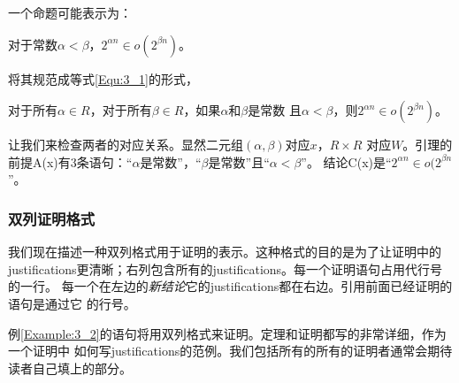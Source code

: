 \begin{example}\label{Example:3_2}
一个命题可能表示为：
\end{example}

\begin{proposition}
对于常数$\alpha<\beta$，$2^{\alpha n} \in o(2^{\beta n})$。
\end{proposition}
将其规范成等式\ref{Equ:3_1}的形式，
\begin{proposition}
对于所有$\alpha\in R$，对于所有$\beta\in R$，如果$\alpha$和$\beta$是常数
且$\alpha<\beta$，则$2^{\alpha n} \in o(2^{\beta n})$。
\end{proposition}

\noindent 让我们来检查两者的对应关系。显然二元组$(\alpha, \beta)$对应$x$，$R\times R$
对应$W$。引理的前提A(x)有3条语句：“$\alpha$是常数”，“$\beta$是常数”且“$\alpha<\beta$”。
结论C(x)是“$2^{\alpha n} \in o(2^{\beta n}$”。

\subsubsection{双列证明格式}
我们现在描述一种双列格式用于证明的表示。这种格式的目的是为了让证明中的
justifications更清晰；右列包含所有的justifications。每一个证明语句占用代行号的一行。
每一个在左边的\emph{新结论}它的justifications都在右边。引用前面已经证明的语句是通过它
的行号。

\begin{example}


例\ref{Example:3_2}的语句将用双列格式来证明。定理和证明都写的非常详细，作为一个证明中
如何写justifications的范例。我们包括所有的所有的证明者通常会期待读者自己填上的部分。

\end{example}

